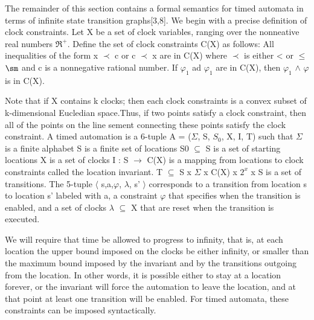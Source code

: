 The remainder of this section contains a formal semantics for timed automata in terms of infinite state transition graphs[3,8]. We begin with a precise definition of clock constraints. Let X be a set of clock variables, ranging over the nonneative real numbers $\Re^{+}$. Define the set of clock constraints C(X) as follows:
All inequalities of the form x $\prec$ c or c $\prec$ x are in C(X) where $\prec$ is either < or  $\leq$ $\sm$ and c is a nonnegative rational number.
If $\varphi_1$ ad $\varphi_{1}$ are in C(X), then $\varphi_1$ $\wedge$ $\varphi$ is in C(X).

Note that if X contains k clocks; then each clock constraints is a convex subset of k-dimensional Eucledian space.Thus, if two points satisfy a clock constraint, then all of the points	on the line sement connecting these points satisfy the clock constraint.
A timed automation is a 6-tuple A = ($\Sigma$, S, $S_0$, X, I, T) such that
$\Sigma$ is a finite alphabet
S is a finite set of locations
S0 $\subseteq$ S is a set of starting locations
X is a set of clocks
I : S $\rightarrow$ C(X) is a mapping from locations to clock constraints called the location invariant.
T $\subseteq$ S x $\Sigma$ x C(X) x $2^{x}$ x S is a set of transitions. The 5-tuple $\langle$ s,a,$\varphi$, $\lambda$, s' $\rangle$ corresponds to a transition from location s to location s' labeled with a, a constraint $\varphi$ that specifies when the transition is enabled, and a set of clocks $\lambda$ $\subseteq$ X that  are reset when the transition is executed.


We will require that time be allowed to progress to infinity, that is, at each location the upper bound imposed on the clocks be either infinity, or smaller than the maximum bound imposed by the invariant and by the transitions outgoing from the location. In other words, it is possible either to stay at a location forever, or the invariant will force the automation to leave the location, and at that point at least one transition will be enabled. For timed automata, these constraints can be imposed syntactically.

